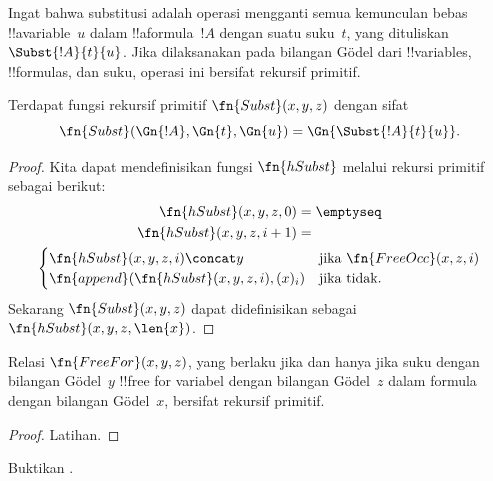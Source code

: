 \documentclass[../../../include/open-logic-section]{subfiles}
\begin{document}

Ingat bahwa substitusi adalah operasi mengganti semua kemunculan bebas
!!a{variable}~$u$ dalam !!a{formula}~$!A$ dengan suatu suku~$t$, yang
dituliskan $\Subst{!A}{t}{u}$. Jika dilaksanakan pada bilangan G\"odel dari
!!{variable}s, !!{formula}s, dan suku, operasi ini bersifat rekursif primitif.

\begin{prop}
Terdapat fungsi rekursif primitif $\fn{Subst}(x, y, z)$ dengan sifat
\[
\fn{Subst}(\Gn{!A}, \Gn{t}, \Gn{u}) = \Gn{\Subst{!A}{t}{u}}.
\]
\end{prop}

\begin{proof}
Kita dapat mendefinisikan fungsi $\fn{hSubst}$ melalui rekursi primitif sebagai
berikut:
\begin{multline*}
\begin{aligned}
\fn{hSubst}(x, y, z, 0) & = \emptyseq \\
\fn{hSubst}(x, y, z, i+1) & =
\end{aligned}\\
\begin{cases}
\fn{hSubst}(x, y, z, i) \concat y & \text{jika $\fn{FreeOcc}(x, z, i)$} \\
\fn{append}(\fn{hSubst}(x, y, z, i), (x)_{i}) & \text{jika tidak.}
\end{cases}
\end{multline*}
Sekarang $\fn{Subst}(x, y, z)$ dapat didefinisikan sebagai
$\fn{hSubst}(x, y, z, \len{x})$.
\end{proof}

\begin{prop}
Relasi $\fn{FreeFor}(x, y, z)$, yang berlaku jika dan hanya jika suku dengan
bilangan G\"odel~$y$ !!{free for} variabel dengan bilangan G\"odel~$z$ dalam
formula dengan bilangan G\"odel~$x$, bersifat rekursif primitif.
\end{prop}

\begin{proof} Latihan. \end{proof}

\begin{prob}
Buktikan .
\end{prob}
\end{document}
